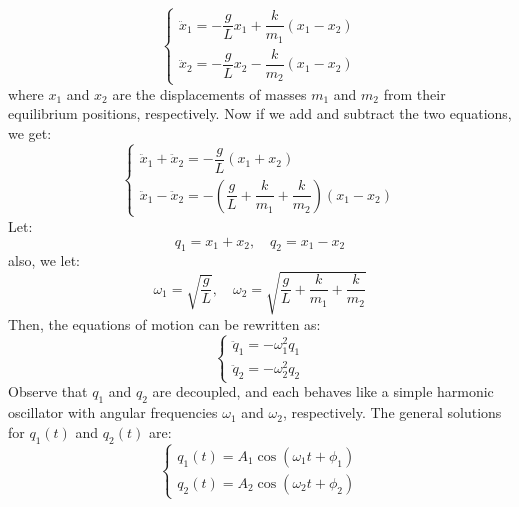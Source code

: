 \documentclass[11pt]{report}
\begin{document}
\begin{definition}
    \begin{equation}\label{eq:coupled_pendulum}
        \begin{cases}
            \ddot{x}_1 = -\dfrac{g}{L}x_1 + \dfrac{k}{m_1} (x_1 - x_2) \\
            \ddot{x}_2 = -\dfrac{g}{L}x_2 - \dfrac{k}{m_2} (x_1 - x_2)
        \end{cases}
    \end{equation}
    where \( x_1 \) and \( x_2 \) are the displacements of masses \( m_1 \) and \( m_2 \) from their equilibrium positions, respectively. Now if we add and subtract the two equations, we get:
    \begin{equation}\label{eq:sum_diff}
        \begin{cases}
            \ddot{x}_1 + \ddot{x}_2 = -\dfrac{g}{L}(x_1 + x_2) \\
            \ddot{x}_1 - \ddot{x}_2 = -\left(\dfrac{g}{L} + \dfrac{k}{m_1} + \dfrac{k}{m_2}\right)(x_1 - x_2)
        \end{cases}
    \end{equation}
    Let:
    \begin{equation}\label{eq:q_defs}
    q_1 = x_1 + x_2, \quad q_2 = x_1 - x_2
    \end{equation}
    also, we let:
    \begin{equation}\label{eq:omega12}
        \omega_1 = \sqrt{\frac{g}{L}}, \quad \omega_2 = \sqrt{\frac{g}{L} + \frac{k}{m_1} + \frac{k}{m_2}}
    \end{equation}
    Then, the equations of motion can be rewritten as:
    \begin{equation}\label{eq:q_odes}
        \begin{cases}
            \ddot{q}_1 = -\omega_1^2 q_1 \\
            \ddot{q}_2 = -\omega_2^2 q_2
        \end{cases}
    \end{equation}
    Observe that \( q_1 \) and \( q_2 \) are decoupled, and each behaves like a simple harmonic oscillator with angular frequencies \( \omega_1 \) and \( \omega_2 \), respectively. The general solutions for \( q_1(t) \) and \( q_2(t) \) are:
    \begin{equation}\label{eq:q_solutions}
        \begin{cases}
            q_1(t) = A_1 \cos(\omega_1 t + \phi_1) \\
            q_2(t) = A_2 \cos(\omega_2 t + \phi_2)
        \end{cases}

\end{equation}
\end{definition}
\end{document}
